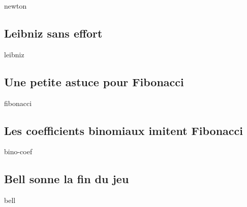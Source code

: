 \documentclass[12pt]{amsart}
\begin{document}
{newton}


\subsection{Leibniz sans effort}

{leibniz}


\subsection{Une petite astuce pour Fibonacci}

{fibonacci}


\subsection{Les coefficients binomiaux imitent Fibonacci}

{bino-coef}


\subsection{Bell sonne la fin du jeu}

{bell}








%
%
%
%
%
%
\end{document}
